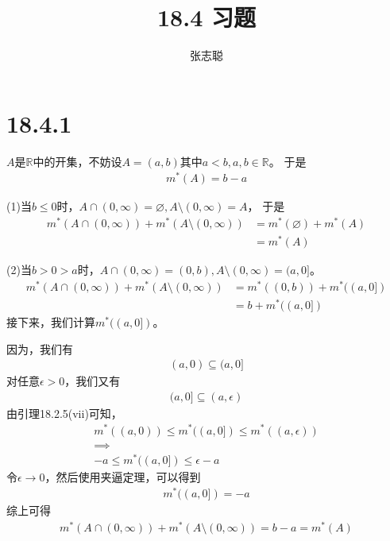 \documentclass{article}
\begin{document}
\title{18.4 习题}
\author{张志聪}
\maketitle

\section*{18.4.1}

$A$是$\mathbb{R}$中的开集，不妨设$A = (a, b)$其中$a < b, a, b \in \mathbb{R}$。
于是
\begin{align*}
  m^{\ast}(A) = b - a
\end{align*}

(1)当$b \leq 0$时，$A \cap (0, \infty) = \varnothing, A \setminus (0, \infty) = A$，
于是
\begin{align*}
  m^{\ast}(A \cap (0, \infty)) + m^{\ast}(A \setminus (0, \infty))
   & = m^{\ast}(\varnothing) + m^{\ast}(A) \\
   & = m^{\ast}(A)
\end{align*}

(2)当$b > 0 > a$时，$A \cap (0, \infty) = (0, b), A \setminus (0, \infty) = (a, 0]$。
\begin{align*}
  m^{\ast}(A \cap (0, \infty)) + m^{\ast}(A \setminus (0, \infty))
   & = m^{\ast}((0, b)) + m^{\ast}((a, 0]) \\
   & = b + m^{\ast}((a, 0])
\end{align*}
接下来，我们计算$m^{\ast}((a, 0])$。

因为，我们有
\begin{align*}
  (a, 0) \subseteq (a, 0]
\end{align*}
对任意$\epsilon > 0$，我们又有
\begin{align*}
  (a, 0] \subseteq (a, \epsilon)
\end{align*}
由引理18.2.5(vii)可知，
\begin{align*}
  m^{\ast}((a, 0)) \leq m^{\ast}((a, 0]) \leq m^{\ast}((a, \epsilon)) \\
  \implies                                                            \\
  -a \leq m^{\ast}((a, 0]) \leq \epsilon - a
\end{align*}
令$\epsilon \to 0$，然后使用夹逼定理，可以得到
\begin{align*}
  m^{\ast}((a, 0]) = -a
\end{align*}
综上可得
\begin{align*}
  m^{\ast}(A \cap (0, \infty)) + m^{\ast}(A \setminus (0, \infty)) = b - a = m^{\ast}(A)
\end{align*}
\end{document}
